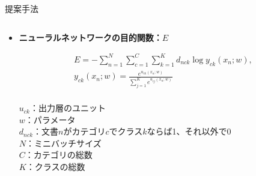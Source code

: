 \documentclass[unicode,10pt]{beamer}
\newlength{\mycolumnwidth}
\newcommand{\itemtitle}[1]{\textbf{#1}\\}
\newcommand{\doublecolumns}[4]{
    \begin{minipage}[t]{#1}
      #2
    \end{minipage}
    \begin{minipage}[t]{#3}
      #4
    \end{minipage}}
\begin{document}
\begin{frame}[t]
\begin{block}{提案手法}
\begin{columns}[onlytextwidth,t]
\begin{column}{\mycolumnwidth}
\begin{itemize}
        \item \itemtitle{ニューラルネットワークの目的関数：$E$}
          \doublecolumns{0.6\linewidth}{
            \vspace{-1.5em} %
            \begin{gather*}
              E = - \sum^{N}_{n = 1} \sum^{C}_{c = 1} \sum^{K}_{k = 1}
                    d_{nck} \log{y_{ck}(x_n; w)},
              \label{eq:NNObjective} \\
              y_{ck}(x_n; w) = \frac{e^{u_{ck}(x_n; w)}}
                                    {\sum^{K}_{j = 1} e^{u_{cj}(x_n; w)}}%
              \nonumber \\
            \end{gather*}
          }{0.375\linewidth}{
            \small
            $u_{ck}$：出力層のユニット \\
            $w$：パラメータ \\
            $d_{nck}$：文書$n$がカテゴリ$c$でクラス$k$ならば1、それ以外で0 \\
            $N$：ミニバッチサイズ \\
            $C$：カテゴリの総数 \\
            $K$：クラスの総数 \\
          }
      \end{itemize}
    \end{column}
  \end{columns}
\end{block}


\end{frame}
\end{document}
